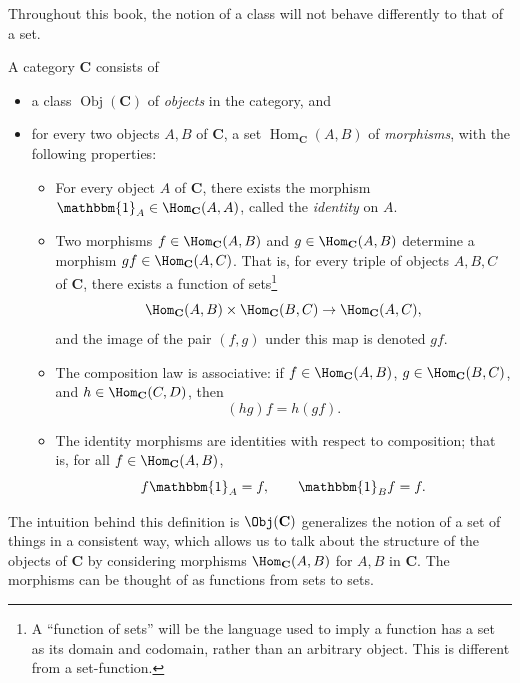 Throughout this book, the notion of a class will not behave differently to that of a set.
\begin{definition}[Category]\label{dfn:1.3.1}
	A category $\mathbf{C}$ consists of
	\begin{itemize}
		\item a class $\operatorname{Obj}(\mathbf{C}) $ of \emph{objects} in the category, and
		\item for every two objects $A,B$ of $\mathbf{C}$, a set $\operatorname{Hom}_\mathbf{C}(A,B)$ of \emph{morphisms}, with the following properties:
			\begin{itemize}
				\item For every object $A$ of $\mathbf{C}$, there exists the morphism $\mathbbm{1}_{A} \in \Hom_{\mathbf{C}}(A,A) $, called the \emph{identity} on $A$.
				\item Two morphisms $f\in \Hom_{\mathbf{C}}(A , B)$ and $g\in \Hom_{\mathbf{C}}(A , B) $ determine a morphism $gf\in \Hom_{\mathbf{C}}(A , C) $. That is, for every triple of objects $A,B,C$ of $\mathbf{C}$, there exists a function of sets\footnote{A ``function of sets'' will be the language used to imply a function has a set as its domain and codomain, rather than an arbitrary object. This is different from a set-function.}
					\[
						\Hom_{\mathbf{C}}(A , B) \times \Hom_{\mathbf{C}}(B , C)  \to \Hom_{\mathbf{C}}(A , C) 
					,\]
					and the image of the pair $(f,g)$ under this map is denoted $gf$.
				\item The composition law is associative: if $f\in \Hom_{\mathbf{C}}(A , B)$, $g\in \Hom_{\mathbf{C}}(B , C) $, and $h\in \Hom_{\mathbf{C}}(C , D) $, then
					\[
						(hg)f=h(gf)
					.\]
				\item The identity morphisms are identities with respect to composition; that is, for all $f\in \Hom_{\mathbf{C}}(A , B) $,
					\[
						f\mathbbm{1}_{A}=f,\qquad \mathbbm{1}_{B}  f=f
					.\]
			\end{itemize}
	\end{itemize}
\end{definition}
The intuition behind this definition is $\Obj( \mathbf{C} ) $ generalizes the notion of a set of things in a consistent way, which allows us to talk about the structure of the objects of $\mathbf{C}$ by considering morphisms $\Hom_{\mathbf{C}}(A , B) $ for $A,B$ in $\mathbf{C}$. The morphisms can be thought of as functions from sets to sets.

